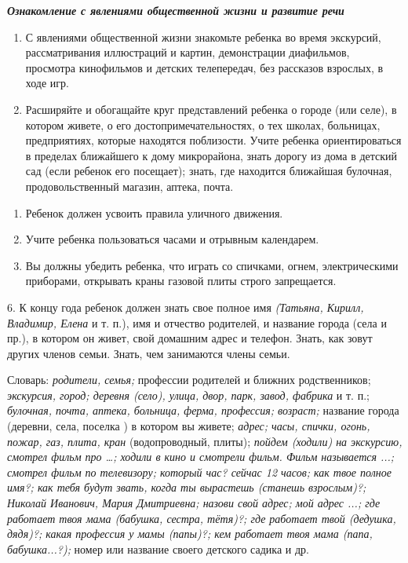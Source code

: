 \documentclass[a5paper]{book}
\renewcommand{\emph}[1]{\textit{#1}}
\begin{document}
\emph{\textbf{Ознакомление с явлениями общественной жизни и развитие
речи}}


\begin{enumerate}
\def\labelenumi{\arabic{enumi}.}
\item
  
  С явлениями общественной жизни знакомьте ребенка во время экскурсий,
  рассматривания иллюстраций и картин, демонстрации диафильмов,
  просмотра кинофильмов и детских телепередач, без рассказов взрослых, в
  ходе игр.
  
\item
  
  Расширяйте и обогащайте круг представлений ребенка о городе (или
  селе), в котором живете, о его достопримечательностях, о тех школах,
  больницах, предприятиях, которые находятся поблизости. Учите ребенка
  ориентироваться в пределах ближайшего к дому микрорайона, знать дорогу
  из дома в детский сад (если ребенок его посещает); знать, где
  находится ближайшая булочная, продовольственный магазин, аптека,
  почта.
  
\end{enumerate}

\begin{enumerate}
\def\labelenumi{\arabic{enumi}.}
\setcounter{enumi}{2}
\item
  
  Ребенок должен усвоить правила уличного движения.
  
\item
  
  Учите ребенка пользоваться часами и отрывным календарем.
  
\item
  
  Вы должны убедить ребенка, что играть со спичками, огнем,
  электрическими приборами, открывать краны газовой плиты строго
  запрещается.
  
\end{enumerate}


6. К концу года ребенок должен знать свое полное имя \emph{(Татьяна,
Кирилл, Владимир, Елена} и т. п.), имя и отчество родителей, и название
города (села и пр.), в котором он живет, свой домашним адрес и телефон.
Знать, как зовут других членов семьи. Знать, чем занимаются члены семьи.

Словарь: \emph{родители, семья;} профессии родителей и ближних
родственников; \emph{экскурсия, город; деревня (село), улица, двор,
парк, завод, фабрика} и т. п.; \emph{булочная, почта, аптека, больница,
ферма, профессия; возраст;} название города (деревни, села, поселка ) в
котором вы живете; \emph{адрес; часы, спички, огонь, пожар, газ, плита,
кран} (водопроводный, плиты); \emph{пойдем (ходили) на экскурсию,
смотрел фильм про \ldots; ходили в кино и смотрели фильм. Фильм}
\emph{называется ...; смотрел фильм по телевизору; который час? сейчас
12 часов; как твое полное имя?; как тебя будут звать, когда ты вырастешь
(станешь взрослым)?; Николай Иванович, Мария Дмитриевна; назови свой
адрес; мой адрес ...; где работает твоя мама (бабушка, сестра, тётя)?;
где работает твой (дедушка, дядя)?; какая профессия у мамы (папы)?; кем
работает твоя мама (папа, бабушка...?);} номер или название своего
детского садика и др.
\end{document}
